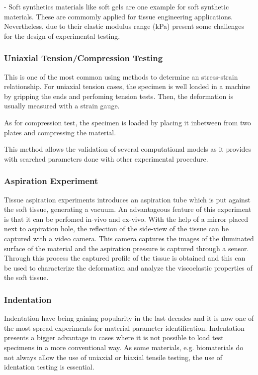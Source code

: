 - Soft synthetics materials like soft gels are one example for soft synthetic materials. These
are commomly applied for tissue engineering applications. Nevertheless, due to their elastic 
modulus range (kPa) present some challenges for the design of experimental testing\cite{Liu2009}.

\subsubsection*{Uniaxial Tension/Compression Testing}

This is one of the most common using methods to determine an stress-strain relationship.
For uniaxial tension cases, the specimen is well loaded in a machine by gripping the ends and perfoming 
tension tests. Then, the deformation is usually measured with a strain gauge. \cite{Bergström2015}

As for compression test, the specimen is loaded by placing it inbetween from two plates 
and compressing the material. \cite{Bergström2015}

This method allows the validation of several computational models as it provides with
 searched parameters done with other experimental procedure. 



\subsubsection*{Aspiration Experiment}

Tissue aspiration experiments introduces an aspiration tube which is put against the 
soft tissue, generating a vacuum. An advantageous feature of this experiment is that 
it can be perfomed in-vivo and ex-vivo.
With the help of a mirror placed next to aspiration 
hole, the reflection of the side-view of the tissue can be captured with a video camera.
This camera captures the images of the iluminated surface of the material and the 
aspiration pressure is captured through a sensor. Through this process the captured 
profile of the tissue is obtained and this can be used to characterize the deformation 
and analyze the viscoelastic properties of the soft tissue\cite{Kauer2002}.

\subsubsection*{Indentation}
Indentation have being gaining popularity in the last decades and it is now one of
 the most spread experiments for material parameter identification.
 Indentation presents a bigger advantage in cases where it is not possible to load
 test specimens in a more conventional way.\cite{Bergström2015} As some materials, e.g. biomaterials do not always 
 allow the use of uniaxial or biaxial tensile testing, the
 use of identation testing is essential.  

